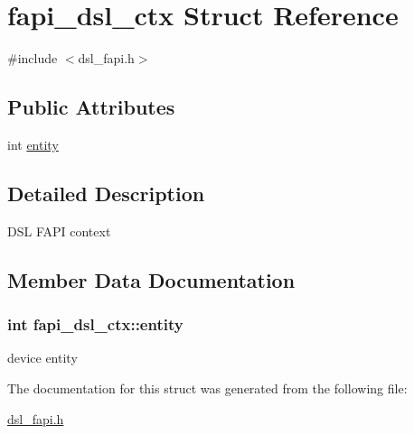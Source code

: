 \hypertarget{structfapi__dsl__ctx}{\section{fapi\-\_\-dsl\-\_\-ctx Struct Reference}
\label{structfapi__dsl__ctx}
}


{\ttfamily \#include $<$dsl\-\_\-fapi.\-h$>$}

\subsection*{Public Attributes}
\begin{DoxyCompactItemize}
\item 
int \hyperlink{structfapi__dsl__ctx_a58e2cf0b91eacbd24b0c91241b93ec89}{entity}
\end{DoxyCompactItemize}


\subsection{Detailed Description}
D\-S\-L F\-A\-P\-I context 

\subsection{Member Data Documentation}
\hypertarget{structfapi__dsl__ctx_a58e2cf0b91eacbd24b0c91241b93ec89}{
\subsubsection[{entity}]{\setlength{\rightskip}{0pt plus 5cm}int fapi\-\_\-dsl\-\_\-ctx\-::entity}}\label{structfapi__dsl__ctx_a58e2cf0b91eacbd24b0c91241b93ec89}
device entity 

The documentation for this struct was generated from the following file\-:\begin{DoxyCompactItemize}
\item 
\hyperlink{dsl__fapi_8h}{dsl\-\_\-fapi.\-h}\end{DoxyCompactItemize}
